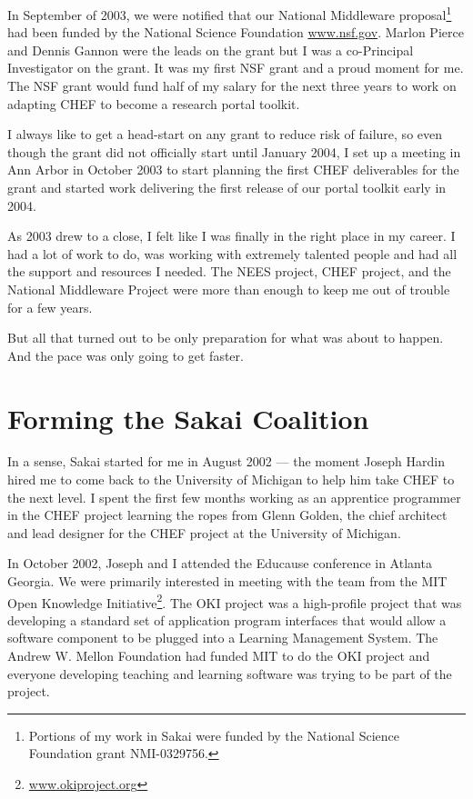 \documentclass[12pt]{book}
\begin{document}
In September of 2003, we were notified that our National
Middleware proposal\footnote{Portions of
my work in Sakai were funded by the National Science
Foundation grant  NMI-0329756.}
had been funded by the National
Science Foundation \url{www.nsf.gov}.
Marlon Pierce and Dennis Gannon were
the leads on the grant but I was a co-Principal Investigator
on the grant.  It was my first NSF grant and a
proud moment for me.  The NSF grant would fund half of my
salary for the next three years to work on adapting
CHEF to become a research portal toolkit.

I always like to get a head-start on any grant to reduce
risk of failure, so even though the grant did not
officially start until January 2004, I set up a meeting
in Ann Arbor in October 2003 to start planning the first CHEF
deliverables for the grant and started work delivering
the first release of our portal toolkit early in
2004.

As 2003 drew to a close, I felt like I was finally in
the right place in my career.  I had a lot of work to
do, was working with extremely talented people
and had all the support and resources I needed.
The NEES project, CHEF project, and the National
Middleware Project were more than
enough to keep me out of trouble for a few years.

But all that turned out to be only preparation for what
was about to happen.  And the pace was only going to
get faster.

\chapter{Forming the Sakai Coalition}

In a sense, Sakai started for me in August 2002 --- the moment Joseph Hardin hired me to
come back to the University of Michigan to help him
take CHEF to the next level.  I spent the first few months working as an
apprentice programmer in the CHEF project learning the ropes from Glenn
Golden, the chief architect and lead designer for the CHEF
project at the University of Michigan.

In October 2002, Joseph and I attended the Educause conference in Atlanta
Georgia.  We were primarily interested in meeting with the team from the
MIT Open Knowledge Initiative\footnote{\url{www.okiproject.org}}.  The OKI project was
a high-profile project that was developing a standard set of
application program interfaces that would allow a software component
to be plugged into a Learning Management System.  The Andrew W. Mellon Foundation
had funded MIT to do the OKI project and everyone developing teaching and learning
software was trying to be part of the project.
\end{document}
